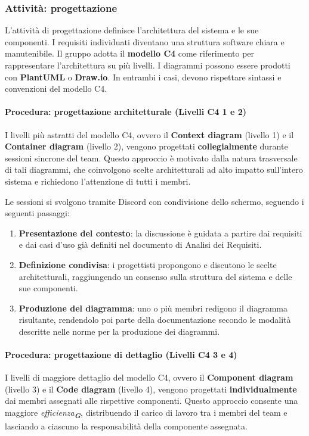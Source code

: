 \documentclass[a4paper,12pt]{article}
\newcommand{\glossario}[1]{\textit{#1}\textsubscript{\textbf{\textit{\textcolor{lightblack}{G}}}}}
\begin{document}
\subsubsection{Attività: progettazione}
L'attività di progettazione definisce l'architettura del sistema e le sue componenti. I requisiti individuati diventano una struttura software chiara e manutenibile. Il gruppo adotta il \textbf{modello C4} come riferimento per rappresentare l'architettura su più livelli. I diagrammi possono essere prodotti con \textbf{PlantUML} o \textbf{Draw.io}. In entrambi i casi, devono rispettare sintassi e convenzioni del modello C4.

\paragraph{Procedura: progettazione architetturale (Livelli C4 1 e 2)}
I livelli più astratti del modello C4, ovvero il \textbf{Context diagram} (livello 1) e il \textbf{Container diagram} (livello 2),
 vengono progettati \textbf{collegialmente} durante sessioni sincrone del team. Questo approccio è motivato dalla natura 
 trasversale di tali diagrammi, che coinvolgono scelte architetturali ad alto impatto sull'intero sistema e richiedono l'attenzione 
 di tutti i membri.

Le sessioni si svolgono tramite Discord con condivisione dello schermo, seguendo i seguenti passaggi:
\begin{enumerate}
    \item \textbf{Presentazione del contesto}: la discussione è guidata a partire dai requisiti
     e dai casi d'uso già definiti nel documento di Analisi dei Requisiti.
    \item \textbf{Definizione condivisa}: i progettisti propongono e discutono le scelte architetturali, raggiungendo un
     consenso sulla struttura del sistema e delle sue componenti.
    \item \textbf{Produzione del diagramma}: uno o più membri redigono il diagramma risultante, rendendolo poi parte  
    della documentazione secondo le modalità descritte nelle norme per la produzione dei diagrammi.
\end{enumerate}

\paragraph{Procedura: progettazione di dettaglio (Livelli C4 3 e 4)}
I livelli di maggiore dettaglio del modello C4, ovvero il \textbf{Component diagram} (livello 3) e il \textbf{Code diagram} (livello 4), 
vengono progettati \textbf{individualmente} dai membri assegnati alle rispettive componenti. 
Questo approccio consente una maggiore \glossario{efficienza}, distribuendo il carico di lavoro tra i membri 
del team e lasciando a ciascuno la responsabilità della componente assegnata.
\end{document}
